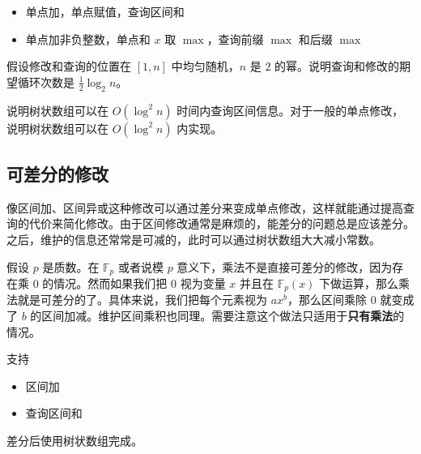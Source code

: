 \begin{exercise}[树状数组的常见应用]
    \begin{itemize}
        \item 单点加，单点赋值，查询区间和
        \item 单点加非负整数，单点和 $x$ 取 $\max$，查询前缀 $\max$ 和后缀 $\max$
    \end{itemize}
\end{exercise}

\begin{exercise}
    假设修改和查询的位置在 $[1,n]$ 中均匀随机，$n$ 是 $2$ 的幂。说明查询和修改的期望循环次数是 $\frac{1}{2}\log_2 n$。
\end{exercise}

\begin{exercise}[树状数组的区间查询与任意单点修改]
    说明树状数组可以在 $O(\log^2 n)$ 时间内查询区间信息。对于一般的单点修改，说明树状数组可以在 $O(\log^2 n)$ 内实现。
\end{exercise}

\subsection{可差分的修改}

像区间加、区间异或这种修改可以通过差分来变成单点修改，这样就能通过提高查询的代价来简化修改。由于区间修改通常是麻烦的，能差分的问题总是应该差分。之后，维护的信息还常常是可减的，此时可以通过树状数组大大减小常数。

\begin{example}
    假设 $p$ 是质数。在 $\mathbb F_p$ 或者说模 $p$ 意义下，乘法不是直接可差分的修改，因为存在乘 $0$ 的情况。然而如果我们把 $0$ 视为变量 $x$ 并且在 $\mathbb F_p(x)$ 下做运算，那么乘法就是可差分的了。具体来说，我们把每个元素视为 $ax^b$，那么区间乘除 $0$ 就变成了 $b$ 的区间加减。维护区间乘积也同理。需要注意这个做法只适用于\textbf{只有乘法}的情况。
\end{example}

\begin{example}
    支持
    \begin{itemize}
        \item 区间加
        \item 查询区间和
    \end{itemize}
    差分后使用树状数组完成。
\end{example}

